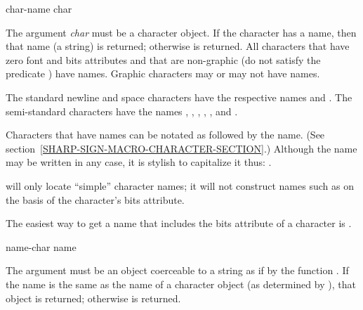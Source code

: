 \begin{defun}[Function]
char-name char

The argument \emph{char} must be a character object.
If the character has a name, then that name (a string) is returned;
otherwise {\false} is returned.  All characters that have
zero font and bits attributes and that are non-graphic
(do not satisfy the predicate ) have names.
Graphic characters may or may not have names.

The standard newline and space characters have the respective
names  and .
The semi-standard characters have the names
, , , , , and .


Characters that have names can be notated as \cd{\#{\Xbackslash}} followed
by the name.  (See section~\ref{SHARP-SIGN-MACRO-CHARACTER-SECTION}.)
Although the name may be written in any case,
it is stylish to capitalize it thus: .

 will only locate ``simple'' character names;
it will not construct names such as  on the
basis of the character's bits attribute.

\begin{new}
The easiest way to get a name that includes the bits attribute of
a character  is .
\end{new}
\end{defun}

\begin{defun}[Function]
name-char name

The argument  must be an object coerceable to a string
as if by the function .
If the name is the same as the name of a character object
(as determined by ), that object
is returned; otherwise {\false} is returned.
\end{defun}